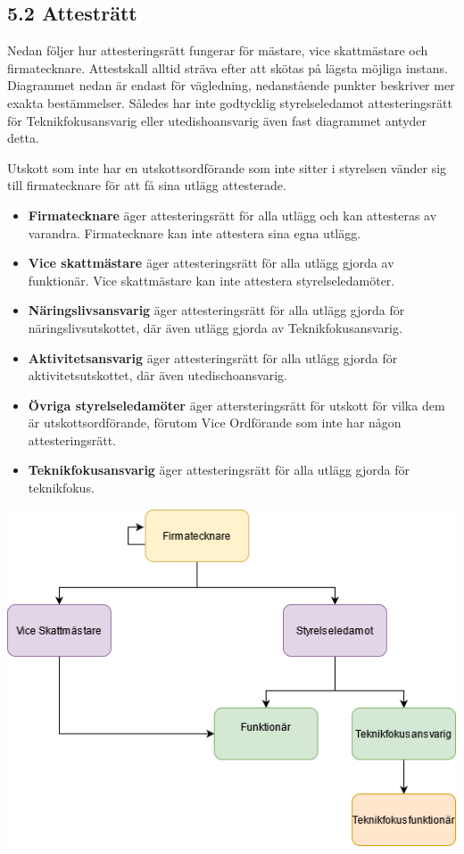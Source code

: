 \documentclass[]{dsekkallelse}
\begin{document}
\subsection{5.2 Attesträtt}
Nedan följer hur attesteringsrätt fungerar för mästare, vice skattmästare och firmatecknare. Attestskall alltid sträva efter att skötas på lägsta möjliga instans. Diagrammet nedan är endast för vägledning, nedanstående punkter beskriver mer exakta bestämmelser. Således har inte godtycklig styrelseledamot attesteringsrätt för Teknikfokusansvarig eller utedishoansvarig även fast diagrammet antyder detta.

Utskott som inte har en utskottsordförande som inte sitter i styrelsen vänder sig till firmatecknare för att få sina utlägg attesterade.

\begin{itemize}
    \item \textbf{Firmatecknare} äger attesteringsrätt för alla utlägg och kan attesteras av varandra. Firmatecknare kan inte attestera sina egna utlägg.
    \item \textbf{Vice skattmästare} äger attesteringsrätt för alla utlägg gjorda av funktionär. Vice skattmästare kan inte attestera styrelseledamöter.
    \item \textbf{Näringslivsansvarig} äger attesteringsrätt för alla utlägg gjorda för näringslivsutskottet, där även utlägg gjorda av Teknikfokusansvarig.
    \item \textbf{Aktivitetsansvarig} äger attesteringsrätt för alla utlägg gjorda för aktivitetsutskottet, där även utedischoansvarig.
    \item \textbf{Övriga styrelseledamöter} äger attersteringsrätt för utskott för vilka dem är utskottsordförande, förutom Vice Ordförande som inte har någon attesteringsrätt.
    \item \textbf{Teknikfokusansvarig} äger attesteringsrätt för alla utlägg gjorda för teknikfokus.
\end{itemize}
\includegraphics[width=\textwidth]{Attestering.png}
\end{document}
